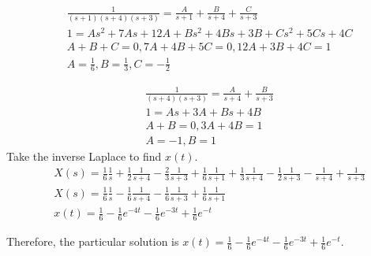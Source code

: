 \documentclass[titlepage]{article}
\begin{document}
\begin{align*}
  &\frac{1}{(s + 1)(s + 4)(s + 3)} = \frac{A}{s + 1} + \frac{B}{s + 4} + \frac{C}{s + 3}
  \\&1 = As^2 + 7As + 12A + Bs^2 + 4Bs + 3B + Cs^2 + 5Cs + 4C
  \\&A + B + C = 0, 7A + 4B + 5C = 0, 12A + 3B + 4C = 1
  \\&A = \frac{1}{6}, B = \frac{1}{3}, C = -\frac{1}{2}
\end{align*}

\begin{align*}
  &\frac{1}{(s + 4)(s + 3)} = \frac{A}{s + 4} + \frac{B}{s + 3}
  \\&1 = As + 3A + Bs + 4B
  \\&A + B = 0, 3A + 4B = 1
  \\&A = -1, B = 1
\end{align*}
Take the inverse Laplace to find $x(t)$.
\begin{align*}
  &X(s) = \frac{1}{6}\frac{1}{s} + \frac{1}{2}\frac{1}{s + 4} - \frac{2}{3}\frac{1}{s + 3} + \frac{1}{6}\frac{1}{s + 1} + \frac{1}{3}\frac{1}{s + 4} - \frac{1}{2}\frac{1}{s + 3} - \frac{1}{s + 4} + \frac{1}{s + 3}
  \\&X(s) = \frac{1}{6}\frac{1}{s} - \frac{1}{6}\frac{1}{s + 4} - \frac{1}{6}\frac{1}{s + 3} + \frac{1}{6}\frac{1}{s + 1}
  \\&x(t) = \frac{1}{6} - \frac{1}{6}e^{-4t} - \frac{1}{6}e^{-3t} + \frac{1}{6}e^{-t}
\end{align*}

Therefore, the particular solution is $x(t) = \frac{1}{6} - \frac{1}{6}e^{-4t} - \frac{1}{6}e^{-3t} + \frac{1}{6}e^{-t}$.
\end{document}
